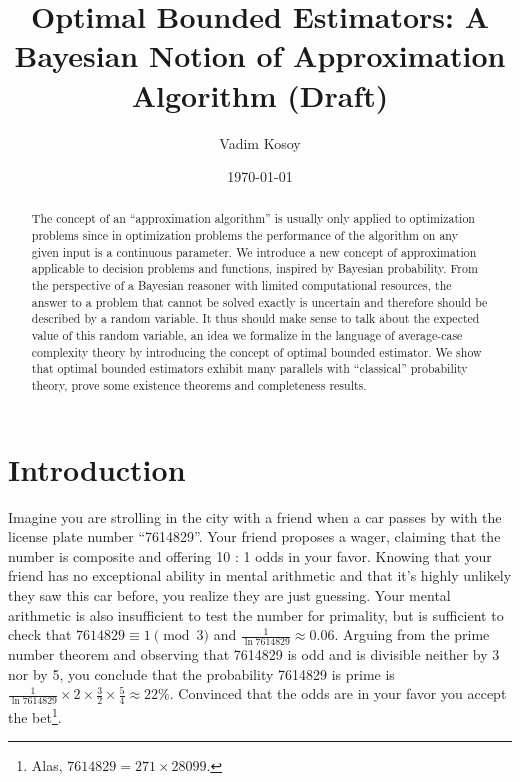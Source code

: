 \documentclass{article}
\numberwithin{equation}{section}
\theoremstyle{definition}
\theoremstyle{plain}
\begin{document}
\title{Optimal Bounded Estimators: A Bayesian Notion of Approximation Algorithm (Draft)}

\author{Vadim Kosoy}

\date{\today}

\maketitle

\begin{abstract}
The concept of an \enquote{approximation algorithm} is usually only applied to optimization problems since in optimization problems the performance of the algorithm on any given input is a continuous parameter. We introduce a new concept of approximation applicable to decision problems and functions, inspired by Bayesian probability. From the perspective of a Bayesian reasoner with limited computational resources, the answer to a problem that cannot be solved exactly is uncertain and therefore should be described by a random variable. It thus should make sense to talk about the expected value of this random variable, an idea we formalize in the language of average-case complexity theory by introducing the concept of optimal bounded estimator. We show that optimal bounded estimators exhibit many parallels with \enquote{classical} probability theory, prove some existence theorems and completeness results.%
\end{abstract}%

\section*{Introduction}
%
Imagine you are strolling in the city with a friend when a car passes by with the license plate number \enquote{7614829}. Your friend proposes a wager, claiming that the number is composite and offering 10 : 1 odds in your favor. Knowing that your friend has no exceptional ability in mental arithmetic and that it's highly unlikely they saw this car before, you realize they are just guessing. Your mental arithmetic is also insufficient to test the number for primality, but is sufficient to check that ${7614829 \equiv 1 \pmod{3}}$ and $\frac{1}{\ln 7614829} \approx 0.06$. Arguing from the prime number theorem and observing that 7614829 is odd and is divisible neither by 3 nor by 5, you conclude that the probability 7614829 is prime is ${\frac{1}{\ln 7614829} \times 2 \times \frac{3}{2} \times \frac{5}{4} \approx 22\%}$. Convinced that the odds are in your favor you accept the bet\footnote{Alas, $7614829 = 271 \times 28099$.}.
\end{document}
